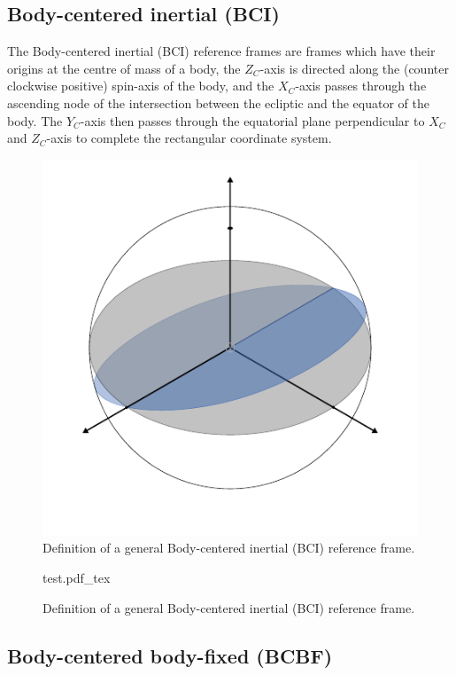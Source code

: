 \subsection{Body-centered inertial (BCI)}

The Body-centered inertial (BCI) reference frames are frames which have their origins at the centre of mass of a body, the $Z_C$-axis is directed along the (counter clockwise positive) spin-axis of the body, and the $X_C$-axis passes through the ascending node of the intersection between the ecliptic and the equator of the body. The $Y_C$-axis then passes through the equatorial plane perpendicular to $X_C$ and $Z_C$-axis to complete the rectangular coordinate system.

\begin{figure}[!htp]
    \centering
    \includegraphics[width=0.4\linewidth]{graphics/test.pdf}
    \caption{Definition of a general Body-centered inertial (BCI) reference frame.}
    \label{fig:bci}
\end{figure}

\begin{figure}[h]
    \centering
    \def\svgwidth{0.4\linewidth}
    {test.pdf_tex}
    \caption{Definition of a general Body-centered inertial (BCI) reference frame.}
    \label{fig:my_label}
\end{figure}

\subsection{Body-centered body-fixed (BCBF)\label{ssec:frame_bcbf}}

